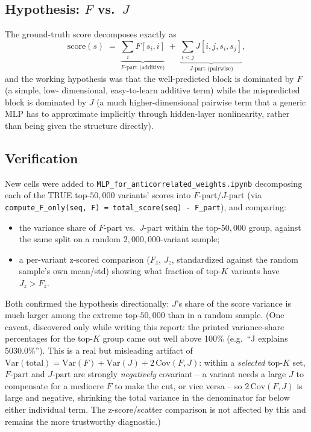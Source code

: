 \documentclass[11pt]{article}
\newcommand{\code}[1]{\texttt{#1}}
\begin{document}
\subsection{Hypothesis: $F$ vs.\ $J$}

The ground-truth score decomposes exactly as
\[
  \mathrm{score}(s) \;=\; \underbrace{\sum_{i} F[s_i, i]}_{F\text{-part (additive)}} \;+\;
  \underbrace{\sum_{i<j} J[i,j,s_i,s_j]}_{J\text{-part (pairwise)}},
\]
and the working hypothesis was that the well-predicted block is dominated by $F$ (a simple, low-
dimensional, easy-to-learn additive term) while the mispredicted block is dominated by $J$ (a much
higher-dimensional pairwise term that a generic MLP has to approximate implicitly through
hidden-layer nonlinearity, rather than being given the structure directly).

\subsection{Verification}

New cells were added to \code{MLP\_for\_anticorrelated\_weights.ipynb} decomposing each of the TRUE
top-$50{,}000$ variants' scores into $F\text{-part}$/$J\text{-part}$ (via
\code{compute\_F\_only(seq, F) = total\_score(seq) - F\_part}), and comparing:
\begin{itemize}
  \item the variance share of $F\text{-part}$ vs.\ $J\text{-part}$ within the top-$50{,}000$ group,
        against the same split on a random $2{,}000{,}000$-variant sample;
  \item a per-variant z-scored comparison ($F_z$, $J_z$, standardized against the random sample's
        own mean/std) showing what fraction of top-$K$ variants have $J_z > F_z$.
\end{itemize}
Both confirmed the hypothesis directionally: $J$'s share of the score variance is much larger among
the extreme top-$50{,}000$ than in a random sample. (One caveat, discovered only while writing this
report: the printed variance-share percentages for the top-$K$ group came out well above 100\%
(e.g.\ ``J explains 5030.0\%''). This is a real but misleading artifact of
$\mathrm{Var}(\text{total}) = \mathrm{Var}(F) + \mathrm{Var}(J) + 2\,\mathrm{Cov}(F,J)$: within a
\emph{selected} top-$K$ set, $F\text{-part}$ and $J\text{-part}$ are strongly \emph{negatively}
covariant -- a variant needs a large $J$ to compensate for a mediocre $F$ to make the cut, or vice
versa -- so $2\,\mathrm{Cov}(F,J)$ is large and negative, shrinking the total variance in the
denominator far below either individual term. The z-score/scatter comparison is not affected by
this and remains the more trustworthy diagnostic.)
\end{document}
